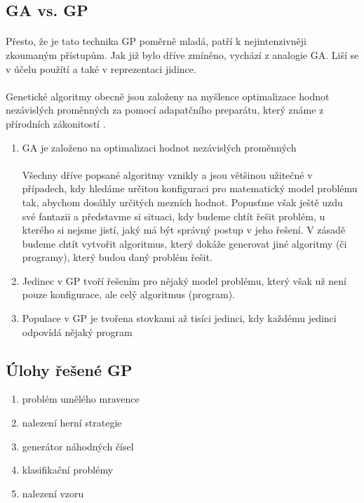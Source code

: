 \documentclass[bc,male,java,dept460]{diploma}		%
\begin{document}
\subsection{GA vs. GP}
\paragraph*{}
Přesto, že je tato technika GP poměrně mladá, patří k nejintenzivněji zkoumaným přístupům. Jak již bylo dříve zmíněno, vychází z analogie GA. Liší se v účelu použítí a také v reprezentaci jidince.

\paragraph*{}
Genetické algoritmy obecně jsou založeny na myšlence optimalizace hodnot nezávislých proměnných za pomocí adapatčního preparátu, který známe z přírodních zákonitostí \cite{evoltech}.

\begin{enumerate}
\item GA je založeno na optimalizaci hodnot nezávislých proměnných
\paragraph*{}
Všechny dříve popsané algoritmy vznikly a jsou většinou užitečné v případech, kdy hledáme určitou konfiguraci pro matematický model problému tak, abychom dosáhly určitých mezních hodnot. Popusťme však ještě uzdu své fantazii a představme si situaci, kdy budeme chtít řešit problém, u kterého si nejsme jistí, jaký má být správný postup v jeho řešení. V zásadě budeme chtít vytvořit algoritmus, který dokáže generovat jiné algoritmy (či programy), který budou daný problém řešit.

\item Jedinec v GP tvoří řešením pro nějaký model problému, který však už není pouze konfigurace, ale celý algoritmus (program).

\item Populace v GP je tvořena stovkami až tisíci jedinci, kdy každému jedinci odpovídá nějaký program
\end{enumerate}

\subsection{Úlohy řešené GP}
\begin{enumerate}
\item problém umělého mravence
\item nalezení herní strategie
\item generátor náhodných čísel
\item klasifikační problémy
\item nalezení vzoru
\end{enumerate}
\end{document}
